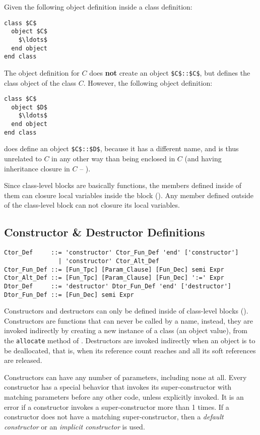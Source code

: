 \example Given the following object definition inside a class definition:
\begin{lstlisting}
class $C$
  object $C$
    $\ldots$
  end object
end class
\end{lstlisting}
The object definition for $C$ does \textbf{not} create an object \lstinline!$C$::$C$!, but defines the class object of the class $C$. However, the following object definition:
\begin{lstlisting}
class $C$
  object $D$
    $\ldots$
  end object
end class
\end{lstlisting}
does define an object \lstinline!$C$::$D$!, because it has a different name, and is thus unrelated to $C$ in any other way than being enclosed in $C$ (and having inheritance closure in $C$ -- ). 

Since class-level blocks are basically functions, the members defined inside of them can closure local variables inside the block (). Any member defined outside of the class-level block can not closure its local variables. 

\subsection{Constructor \& Destructor Definitions}
\label{sec:constructor-destructor-def}

\syntax\begin{lstlisting}
Ctor_Def     ::= 'constructor' Ctor_Fun_Def 'end' ['constructor']
               | 'constructor' Ctor_Alt_Def
Ctor_Fun_Def ::= [Fun_Tpc] [Param_Clause] [Fun_Dec] semi Expr
Ctor_Alt_Def ::= [Fun_Tpc] [Param_Clause] [Fun_Dec] ':=' Expr
Dtor_Def     ::= 'destructor' Dtor_Fun_Def 'end' ['destructor']
Dtor_Fun_Def ::= [Fun_Dec] semi Expr
\end{lstlisting}

Constructors and destructors can only be defined inside of class-level blocks (). Constructors are functions that can never be called by a name, instead, they are invoked indirectly by creating a new instance of a class (an object value), from the \lstinline!allocate! method of . Destructors are invoked indirectly when an object is to be deallocated, that is, when its reference count reaches  and all its soft references are released. 

Constructors can have any number of parameters, including none at all. Every constructor has a special behavior that invokes its super-constructor with matching parameters before any other code, unless explicitly invoked. It is an error if a constructor invokes a super-constructor more than 1 times. If a constructor does not have a matching super-constructor, then a {\em default constructor} or an {\em implicit constructor} is used.

